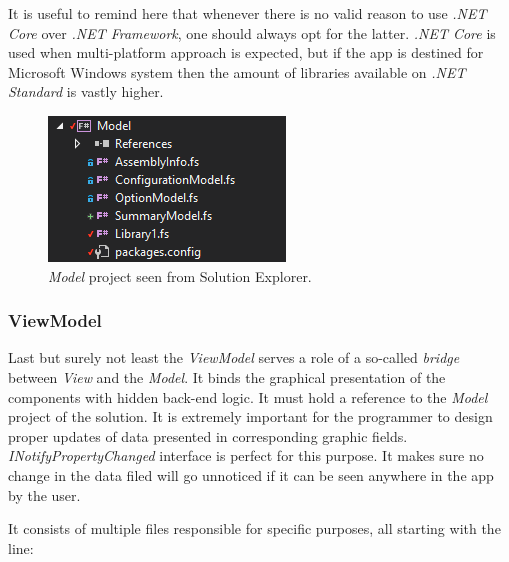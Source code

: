         It is useful to remind here that whenever there is no valid reason to use \textit{.NET Core} over \textit{.NET Framework}, one should always opt for the latter. \textit{.NET Core} is used when multi-platform approach is expected, but if the app is destined for Microsoft Windows system then the amount of libraries available on \textit{.NET Standard} is vastly higher.
        
        \begin{figure}[H]
            \centering
            \includegraphics{img/model.png}
            \caption{\textit{Model} project seen from Solution Explorer.}
            \label{fig:model}
        \end{figure} 
        
    \subsubsection{ViewModel}  
        Last but surely not least the \textit{ViewModel} serves a role of a so-called \textit{bridge} between \textit{View} and the \textit{Model}. It binds the graphical presentation of the components with hidden back-end logic. It must hold a reference to the \textit{Model} project of the solution. It is extremely important for the programmer to design proper updates of data presented in corresponding graphic fields. \textit{INotifyPropertyChanged} interface is perfect for this purpose. It makes sure no change in the data filed will go unnoticed if it can be seen anywhere in the app by the user.
        
        It consists of multiple files responsible for specific purposes, all starting with the line:
        
